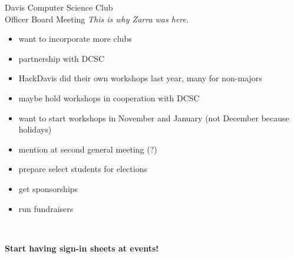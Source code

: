 \documentclass{article}
\begin{document}
\begin{Minutes}{Davis Computer Science Club\\Officer Board Meeting}
\textit{This is why Zarra was here.}
\begin{itemize}
\item want to incorporate more clubs
\item partnership with DCSC
\item HackDavis did their own workshops last year, many for non-majors
\item maybe hold workshops in cooperation with DCSC
\item want to start workshops in November and January (not December because holidays)
\end{itemize}

\begin{itemize}
\item mention at second general meeting (?)
\item prepare select students for elections
\end{itemize}

\begin{itemize}
\item get sponsorships
\item run fundraisers
\end{itemize}

\ \\
\centerline{\textbf{Start having sign-in sheets at events!}}
\thispagestyle{creditfooter}
\end{Minutes}
\end{document}

